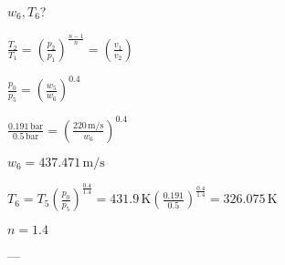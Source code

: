\( w_6, T_6 \)?  

\( \frac{T_2}{T_1} = \left( \frac{p_2}{p_1} \right)^{\frac{n-1}{n}} = \left( \frac{v_1}{v_2} \right) \)  

\( \frac{p_0}{p_5} = \left( \frac{w_5}{w_6} \right)^{0.4} \)  

\( \frac{0.191 \, \text{bar}}{0.5 \, \text{bar}} = \left( \frac{220 \, \text{m/s}}{w_6} \right)^{0.4} \)  

\( w_6 = 437.471 \, \text{m/s} \)  

\( T_6 = T_5 \left( \frac{p_0}{p_5} \right)^{\frac{0.4}{1.4}} = 431.9 \, \text{K} \left( \frac{0.191}{0.5} \right)^{\frac{0.4}{1.4}} = 326.075 \, \text{K} \)  

\( n = 1.4 \)  

---